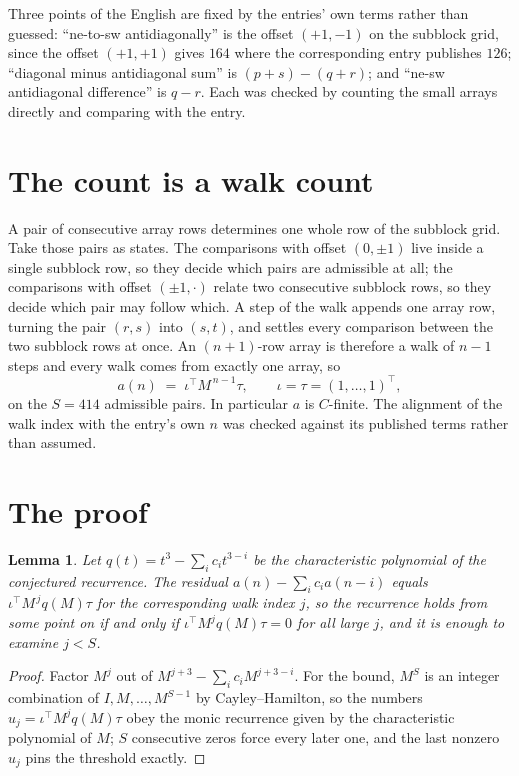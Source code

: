 \documentclass[11pt,a4paper]{article}
\theoremstyle{plain}
\newtheorem{lemma}[theorem]{Lemma}
\theoremstyle{definition}
\begin{document}
Three points of the English are fixed by the entries' own terms rather than guessed:
``ne-to-sw antidiagonally'' is the offset $(+1,-1)$ on the subblock grid, since the offset
$(+1,+1)$ gives $164$ where the corresponding entry publishes $126$; ``diagonal minus
antidiagonal sum'' is $(p+s)-(q+r)$; and ``ne-sw antidiagonal difference'' is $q-r$. Each was
checked by counting the small arrays directly and comparing with the entry.

\section{The count is a walk count}

A pair of consecutive array rows determines one whole row of the subblock grid. Take those
pairs as states. The comparisons with offset $(0,\pm1)$ live inside a single subblock row, so
they decide which pairs are admissible at all; the comparisons with offset $(\pm1,\cdot)$
relate two consecutive subblock rows, so they decide which pair may follow which. A step of the
walk appends one array row, turning the pair $(r,s)$ into $(s,t)$, and settles every comparison
between the two subblock rows at once. An $(n+1)$-row array is therefore a walk of $n-1$ steps
and every walk comes from exactly one array, so
\[
a(n)\;=\;\iota^{\!\top}M^{\,n-1}\tau,\qquad \iota=\tau=(1,\dots,1)^{\!\top},
\]
on the $S=414$ admissible pairs. In particular $a$ is $C$-finite. The alignment of the walk
index with the entry's own $n$ was checked against its published terms rather than assumed.

\section{The proof}

\begin{lemma}\label{lem:crit}
Let $q(t)=t^{3}-\sum_i c_it^{3-i}$ be the characteristic polynomial of the
conjectured recurrence. The residual $a(n)-\sum_ic_ia(n-i)$ equals
$\iota^{\!\top}M^{\,j}q(M)\tau$ for the corresponding walk index $j$, so the recurrence
holds from some point on if and only if $\iota^{\!\top}M^{j}q(M)\tau=0$ for all large $j$,
and it is enough to examine $j<S$.
\end{lemma}

\begin{proof}
Factor $M^{j}$ out of $M^{j+3}-\sum_ic_iM^{j+3-i}$. For the bound, $M^{S}$
is an integer combination of $I,M,\dots,M^{S-1}$ by Cayley--Hamilton, so the numbers
$u_j=\iota^{\!\top}M^{j}q(M)\tau$ obey the monic recurrence given by the characteristic
polynomial of $M$; $S$ consecutive zeros force every later one, and the last nonzero $u_j$
pins the threshold exactly.
\end{proof}
\end{document}
